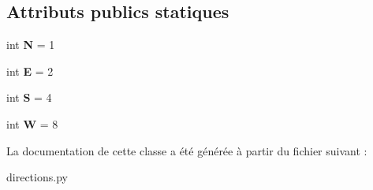 \subsection*{Attributs publics statiques}
\begin{DoxyCompactItemize}
\item 
\mbox{\label{classdirections_1_1Direction_a61083067da15f0c0e1a8d8ac9c725d5b}} 
int {\bfseries N} = 1
\item 
\mbox{\label{classdirections_1_1Direction_acff32c8397f7f9a4593149af0b6b58a0}} 
int {\bfseries E} = 2
\item 
\mbox{\label{classdirections_1_1Direction_a226aeb37b6b75116dc345835a6686f99}} 
int {\bfseries S} = 4
\item 
\mbox{\label{classdirections_1_1Direction_aa7d4691007527f96a7545ec36ce6a25c}} 
int {\bfseries W} = 8
\end{DoxyCompactItemize}


La documentation de cette classe a été générée à partir du fichier suivant \+:\begin{DoxyCompactItemize}
\item 
directions.\+py\end{DoxyCompactItemize}

